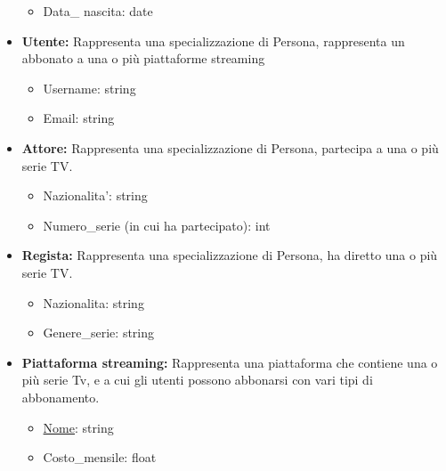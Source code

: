 \documentclass[12pt,a4paper]{article}
\begin{document}
\begin{itemize}
\begin{itemize}
        \item Data\_ nascita: date
    \end{itemize}
    \item \textbf{Utente:} Rappresenta una specializzazione di Persona, rappresenta un abbonato a una o più piattaforme streaming
    \begin{itemize}
        \item Username: string
        \item Email: string
    \end{itemize}
    \item \textbf{Attore:} Rappresenta una specializzazione di Persona, partecipa a una o più serie TV.
    \begin{itemize}
        \item Nazionalita': string
        \item Numero\_serie (in cui ha partecipato): int
    \end{itemize}
    \item \textbf{Regista:} Rappresenta una specializzazione di Persona, ha diretto una o più serie TV.
    \begin{itemize}
        \item Nazionalita: string
        \item Genere\_serie: string
    \end{itemize}
    \item \textbf{Piattaforma streaming:} Rappresenta una piattaforma che contiene una o più serie Tv, e a cui gli utenti possono abbonarsi con vari tipi di abbonamento.
    \begin{itemize}
        \item \underline{Nome}: string
        \item Costo\_mensile: float
    \end{itemize}
\end{itemize}
\end{document}
